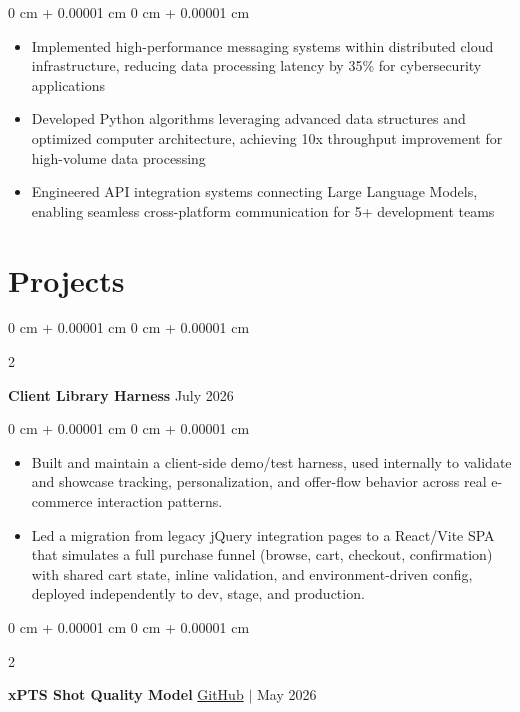 \documentclass[10pt, letterpaper]{article}
\newenvironment{highlights}{
    \begin{itemize}[
        topsep=0.06 cm,
        parsep=0.06 cm,
        partopsep=0pt,
        itemsep=0pt,
        leftmargin=0 cm + 10pt
    ]
}{
    \end{itemize}
}
\newenvironment{onecolentry}{
    \begin{adjustwidth}{
        0 cm + 0.00001 cm
    }{
        0 cm + 0.00001 cm
    }
}{
    \end{adjustwidth}
}
\newenvironment{twocolentry}[2][]{
    \onecolentry
    \def\secondColumn{#2}
    \setcolumnwidth{\fill, 4.5 cm}
    \begin{paracol}{2}
}{
    \switchcolumn \raggedleft \secondColumn
    \end{paracol}
    \endonecolentry
}
\begin{document}
\vspace{0.06 cm}
\begin{onecolentry}
    \begin{highlights}
        \item Implemented high-performance messaging systems within distributed cloud infrastructure, reducing data processing latency by 35\% for cybersecurity applications
        \item Developed Python algorithms leveraging advanced data structures and optimized computer architecture, achieving 10x throughput improvement for high-volume data processing
        \item Engineered API integration systems connecting Large Language Models, enabling seamless cross-platform communication for 5+ development teams
    \end{highlights}
\end{onecolentry}

\section{Projects}

\begin{twocolentry}{
     July 2026
}
    \textbf{Client Library Harness}\end{twocolentry}

\vspace{0.06 cm}
\begin{onecolentry}
    \begin{highlights}
        \item Built and maintain a client-side demo/test harness, used internally to validate and showcase tracking, personalization, and offer-flow behavior across real e-commerce interaction patterns.
        \item Led a migration from legacy jQuery integration pages to a React/Vite SPA that simulates a full purchase funnel (browse, cart, checkout, confirmation) with shared cart state, inline validation, and environment-driven config, deployed independently to dev, stage, and production.
    \end{highlights}
\end{onecolentry}

\begin{twocolentry}{
    \href{https://github.com/Amin9666/xPTS-Shot-Quality-Model}{GitHub} $|$ May 2026
}
    \textbf{xPTS Shot Quality Model}\end{twocolentry}
\end{document}

